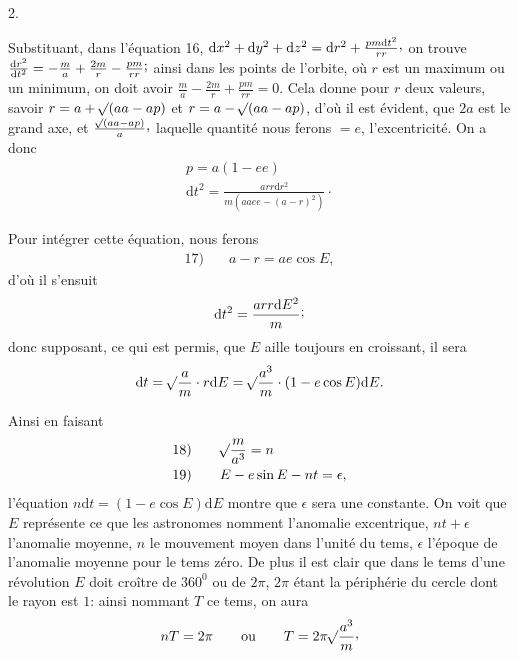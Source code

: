\par{}\bigskip
{}
\begin{center}2.\end{center}
\noindent\hspace*{\parindent}Substituant, dans l’équation 16, \(\mathrm{d}x^2+\mathrm{d}y^2+\mathrm{d}z^2=\mathrm{d}r^2+\frac{pm\mathrm{d}t^2}{rr}\mathpunct{\raisebox{.45ex}{,}}\) on trouve \(\frac{\mathrm{d}r^2}{\mathrm{d}t^2}=-\frac{m}{a}+\frac{2m}{r}-\frac{pm}{rr}\mathpunct{\raisebox{.45ex}{;}}\) ainsi dans les points de l’orbite, où \(r\) est un maximum ou un minimum, on doit avoir \(\frac{m}{a}-\frac{2m}{r}+\frac{pm}{rr}=0\). Cela donne pour \(r\) deux valeurs, savoir \(r=a+\mathord{{}^{}\!\surd}(aa-ap)\) et \(r=a-\mathord{{}^{}\!\surd}(aa-ap)\), d’où il est évident, que \(2a\) est le grand axe, et \(\frac{\BareRoot{(aa-ap)}}{a}\mathpunct{\raisebox{.45ex}{,}}\) laquelle quantité nous ferons \(=e\), l’excentricité. On a donc
\[
\begin{gathered}
p=a(1-ee)\\[4pt]
\mathrm{d}t^2=\frac{arr\mathrm{d}r^2}{m(aaee-(a-r)^2)}\mathpunct{\cdot}
\end{gathered}
\]
\par Pour intégrer cette équation, nous ferons
\[
\begin{array}{rl}17)\quad&a-r=ae\cos E,\end{array}
\]
d’où il s’ensuit
\[
\mathrm{d}t^2=\frac{arr\mathrm{d}E^2}{m}\mathpunct{\raisebox{.45ex}{;}}
\]
donc supposant, ce qui est permis, que \(E\) aille toujours en croissant, il sera
\[
\mathrm{d}t=\mathord{{}^{}\!\surd}\frac{a}{m}\cdot r\mathrm{d}E=\mathord{{}^{}\!\surd}\frac{a^3}{m}\cdot(1-e\cos E)\mathrm{d}E.
\]
\par Ainsi en faisant
\[
\begin{array}{rl}
18)\quad&\mathord{{}^{}\!\surd}\dfrac{m}{a^3}=n\\[6pt]
19)\quad&E-e\sin E-nt=\epsilon,
\end{array}
\]
l’équation \(n\mathrm{d}t=(1-e\cos E)\mathrm{d}E\) montre que \(\epsilon\) sera une constante. On voit que \(E\) représente ce que les astronomes nomment l’anomalie excentrique, \(nt+\epsilon\) l’anomalie moyenne, \(n\) le mouvement moyen dans l’unité du tems, \(\epsilon\) l’époque de l’anomalie moyenne pour le tems zéro. De plus il est clair que dans le tems d’une révolution \(E\) doit croître de \(360^{0}\) ou de \(2\pi\), \(2\pi\) étant la périphérie du cercle dont le rayon est \(1\): ainsi nommant \(T\) ce tems, on aura
\[
nT=2\pi\qquad\text{ou}\qquad T=2\pi\BareRoot{\frac{a^3}{m}}\mathpunct{\raisebox{.45ex}{,}}
\]
